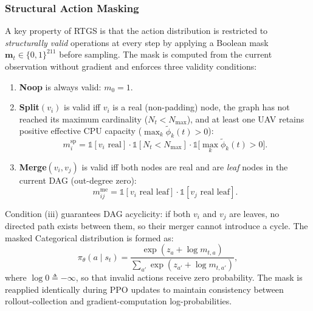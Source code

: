 \subsubsection*{Structural Action Masking}
\label{subsubsec:masking}

A key property of RTGS is that the action distribution is restricted
to \emph{structurally valid} operations at every step by applying a
Boolean mask $\mathbf{m}_t \in \{0,1\}^{211}$ before sampling.
The mask is computed from the current observation without gradient
and enforces three validity conditions:

\begin{enumerate}[label=(\roman*), leftmargin=*, itemsep=2pt]
  \item \textbf{Noop} is always valid:
        $m_0 = 1$.
  \item \textbf{Split}$(v_i)$ is valid iff $v_i$ is a real
        (non-padding) node, the graph has not reached its maximum
        cardinality ($N_t < N_{\max}$), and at least one UAV
        retains positive effective CPU capacity
        ($\max_k \tilde{\phi}_k(t) > 0$):
        \begin{equation}
          m_i^{\mathrm{sp}} =
            \mathbb{1}[v_i\text{ real}] \cdot
            \mathbb{1}[N_t < N_{\max}] \cdot
            \mathbb{1}\!\bigl[\max_k \tilde{\phi}_k(t) > 0\bigr].
          \label{eq:mask_split}
        \end{equation}
  \item \textbf{Merge}$(v_i, v_j)$ is valid iff both nodes
        are real and are \emph{leaf} nodes in the current DAG
        (out-degree zero):
        \begin{equation}
          m_{ij}^{\mathrm{me}} =
            \mathbb{1}[v_i\text{ real leaf}] \cdot
            \mathbb{1}[v_j\text{ real leaf}].
          \label{eq:mask_merge}
        \end{equation}
\end{enumerate}

Condition (iii) guarantees DAG acyclicity: if both $v_i$ and $v_j$
are leaves, no directed path exists between them, so their merger
cannot introduce a cycle.
The masked Categorical distribution is formed as:
\begin{equation}
  \pi_\theta(a \mid s_t) =
    \frac{\exp(z_a + \log m_{t,a})}
         {\sum_{a'} \exp(z_{a'} + \log m_{t,a'})},
  \label{eq:masked_policy}
\end{equation}
where $\log 0 \triangleq -\infty$, so that invalid actions
receive zero probability.
The mask is reapplied identically during PPO updates to maintain
consistency between rollout-collection and gradient-computation
log-probabilities.

